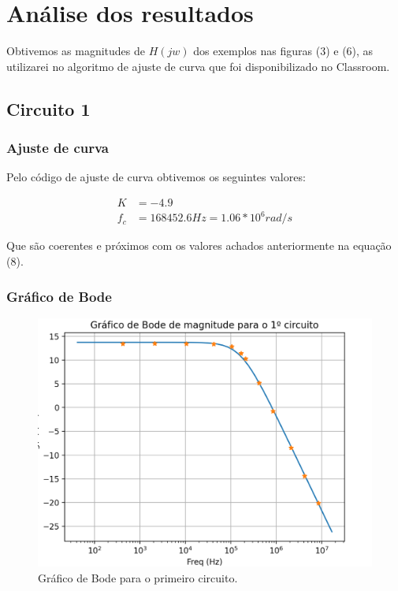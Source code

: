 \documentclass[12pt,twoside, a4paper, twocolumn]{article}
\begin{document}
\newpage


\section{Análise dos resultados}


Obtivemos as magnitudes de $H(jw)$ dos exemplos nas figuras (3) e (6), as utilizarei no algoritmo de ajuste de curva que foi disponibilizado no Classroom.


\subsection{Circuito 1}


\subsubsection{Ajuste de curva}


Pelo código de ajuste de curva obtivemos os seguintes valores:


\begin{equation}
    \begin{aligned}
        K   & = -4.9                            \\
        f_c & = 168452.6 Hz = 1.06 * 10^6 rad/s
    \end{aligned}
\end{equation}


Que são coerentes e próximos com os valores achados anteriormente na equação (8).


\subsubsection{Gráfico de Bode}


\begin{figure}[H]
    \centering
    \includegraphics[width=1\columnwidth]{images/bode1.png}
    \caption{Gráfico de Bode para o primeiro circuito.}
\end{figure}
\end{document}
